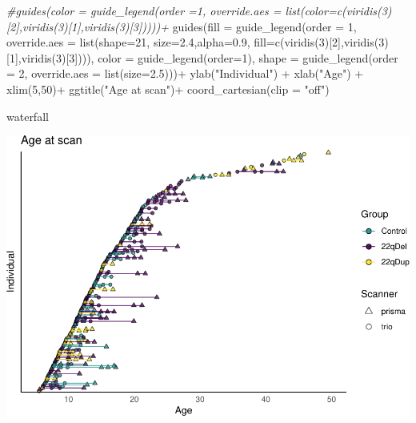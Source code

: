 \documentclass[
]{article}
\newenvironment{Shaded}{\begin{snugshade}}{\end{snugshade}}
\newcommand{\AttributeTok}[1]{\textcolor[rgb]{0.77,0.63,0.00}{#1}}
\newcommand{\CommentTok}[1]{\textcolor[rgb]{0.56,0.35,0.01}{\textit{#1}}}
\newcommand{\DecValTok}[1]{\textcolor[rgb]{0.00,0.00,0.81}{#1}}
\newcommand{\FloatTok}[1]{\textcolor[rgb]{0.00,0.00,0.81}{#1}}
\newcommand{\FunctionTok}[1]{\textcolor[rgb]{0.00,0.00,0.00}{#1}}
\newcommand{\NormalTok}[1]{#1}
\newcommand{\SpecialCharTok}[1]{\textcolor[rgb]{0.00,0.00,0.00}{#1}}
\newcommand{\StringTok}[1]{\textcolor[rgb]{0.31,0.60,0.02}{#1}}
\begin{document}
\begin{Shaded}
\begin{Highlighting}[]
  \CommentTok{\#guides(color  = guide\_legend(order =1, override.aes = list(color=c(viridis(3)[2],viridis(3)[1],viridis(3)[3]))))+}
  \FunctionTok{guides}\NormalTok{(}\AttributeTok{fill  =} \FunctionTok{guide\_legend}\NormalTok{(}\AttributeTok{order =} \DecValTok{1}\NormalTok{, }\AttributeTok{override.aes =} \FunctionTok{list}\NormalTok{(}\AttributeTok{shape=}\DecValTok{21}\NormalTok{, }\AttributeTok{size=}\FloatTok{2.4}\NormalTok{,}\AttributeTok{alpha=}\FloatTok{0.9}\NormalTok{, }\AttributeTok{fill=}\FunctionTok{c}\NormalTok{(}\FunctionTok{viridis}\NormalTok{(}\DecValTok{3}\NormalTok{)[}\DecValTok{2}\NormalTok{],}\FunctionTok{viridis}\NormalTok{(}\DecValTok{3}\NormalTok{)[}\DecValTok{1}\NormalTok{],}\FunctionTok{viridis}\NormalTok{(}\DecValTok{3}\NormalTok{)[}\DecValTok{3}\NormalTok{]))),}
         \AttributeTok{color =} \FunctionTok{guide\_legend}\NormalTok{(}\AttributeTok{order=}\DecValTok{1}\NormalTok{),}
         \AttributeTok{shape =} \FunctionTok{guide\_legend}\NormalTok{(}\AttributeTok{order =} \DecValTok{2}\NormalTok{, }\AttributeTok{override.aes =} \FunctionTok{list}\NormalTok{(}\AttributeTok{size=}\FloatTok{2.5}\NormalTok{)))}\SpecialCharTok{+}
  \FunctionTok{ylab}\NormalTok{(}\StringTok{"Individual"}\NormalTok{) }\SpecialCharTok{+}
  \FunctionTok{xlab}\NormalTok{(}\StringTok{"Age"}\NormalTok{) }\SpecialCharTok{+}
  \FunctionTok{xlim}\NormalTok{(}\DecValTok{5}\NormalTok{,}\DecValTok{50}\NormalTok{)}\SpecialCharTok{+}
  \FunctionTok{ggtitle}\NormalTok{(}\StringTok{"Age at scan"}\NormalTok{)}\SpecialCharTok{+}
  \FunctionTok{coord\_cartesian}\NormalTok{(}\AttributeTok{clip =} \StringTok{"off"}\NormalTok{)}

\NormalTok{waterfall}
\end{Highlighting}
\end{Shaded}

\includegraphics{22q_subcort_volumes_revised_files/figure-latex/unnamed-chunk-15-1.pdf}
\end{document}
